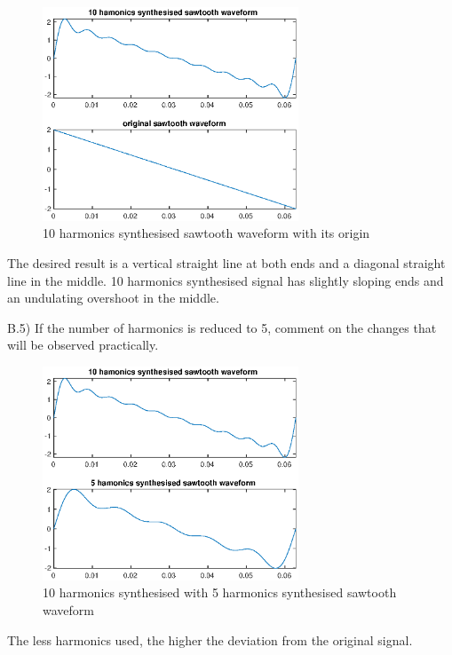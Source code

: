\begin{figure}[h]
  \centering
  \includegraphics[width=3in]{matlab/fig/B_q_1.eps}
  \caption{10 harmonics synthesised sawtooth waveform with its origin}    
  \label{fig:B_q_1}
\end{figure}

The desired result is a vertical straight line at both ends and a diagonal straight line in the middle. 10 harmonics synthesised signal has slightly sloping ends and an undulating overshoot in the middle.

\begin{tcolorbox}
  B.5) If the number of harmonics is reduced to 5, comment on the changes that will be observed practically.
\end{tcolorbox}

\begin{figure}[h]
  \centering
  \includegraphics[width=3in]{matlab/fig/B_q_2.eps}
  \caption{10 harmonics synthesised with 5 harmonics synthesised sawtooth waveform}    
  \label{fig:B_q_2}
\end{figure}

The less harmonics used, the higher the deviation from the original signal.

\pagebreak